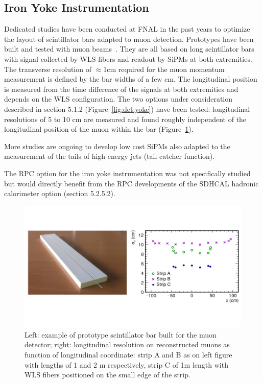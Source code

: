 \subsection{Iron Yoke Instrumentation}

Dedicated studies have been conducted at FNAL in the past years to optimize the layout of scintillator bars adapted to muon detection. Prototypes have been built and tested with muon beams~\cite{Denisov:2015jjl}. They are all based on long scintillator bars with signal collected by WLS fibers and readout by SiPMs at both extremities. The transverse resolution of $\approx$1cm required for the muon momentum measurement is defined by the bar widths of a few cm. The longitudinal position is measured from the time difference of the signals at both extremities and depends on the WLS configuration. The two options under consideration described in section 5.1.2 (Figure~\ref{fig:det:yoke}) have been tested: longitudinal resolutions of 5 to 10 cm are measured and found roughly independent of the longitudinal position of the muon within the bar (Figure~\ref{fig:det:Iron_proto}). 

More studies are ongoing to develop low cost SiPMs also adapted to the measurement of the tails of high energy jets (tail catcher function). 

The RPC option for the iron yoke instrumentation was not specifically studied but would directly benefit from the RPC developments of the SDHCAL hadronic calorimeter option (section 5.2.5.2).   


\begin{figure}[t!]
\centering
\includegraphics[width=1.0\hsize]{Detector/fig/Iron_proto.jpg}
\caption{Left: example of prototype scintillator bar built for the muon detector; right: longitudinal resolution on reconstructed muons as function of longitudinal coordinate: strip A and B as on left figure with lengths of 1 and 2 m respectively, strip C of 1m length with WLS fibers positioned on the small edge of the strip.}
\label{fig:det:Iron_proto}
\end{figure}